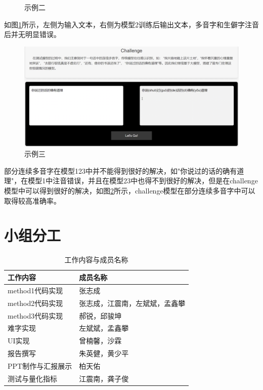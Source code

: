 \documentclass[12pt,hyperref,a4paper,UTF8]{ctexart}
\begin{document}
\begin{itemize}
\begin{itemize}
\begin{figure}[H]
            \caption{示例二}
            \label{9}
        \end{figure}
        如图\ref{9}所示，左侧为输入文本，右侧为模型2训练后输出文本，多音字和生僻字注音后并无明显错误。
        \begin{figure}[H]
            \centering
            \includegraphics[width=0.7\linewidth]{figures/fig10.png}
            \caption{示例三}
            \label{10}
        \end{figure}
        部分连续多音字在模型123中并不能得到很好的解决，如"你说过的话的确有道理"，在模型1中注音错误，并且在模型23中也得不到很好的解决，但是在challenge模型中可以得到很好的解决，如图\ref{10}所示，challenge模型在部分连续多音字中可以取得较高准确率。
    \end{itemize}
\end{itemize}
\section{小组分工}
\begin{table}[H] %
    \centering
    \begin{tabular}{>{\centering\arraybackslash}p{} >{\centering\arraybackslash}p{}} %
        \toprule
        \textbf{工作内容} & \textbf{成员名称} \\ %
        \midrule
        method1代码实现 & 张志成 \\
        method2代码实现 & 张志成，江震南，左斌斌，孟鑫攀 \\
        method3代码实现 & 郝锐，邱骏坤 \\
        难字实现 & 左斌斌，孟鑫攀 \\
        UI实现 & 曾楠馨，沙霖 \\
        报告撰写 & 朱英健，黄少平 \\
        PPT制作与汇报展示 & 柏天佑 \\
        测试与量化指标 & 江震南，龚子俊 \\
        \bottomrule
    \end{tabular}
    \caption{工作内容与成员名称}
    \label{tab:work_distribution}
\end{table}


\end{document}
